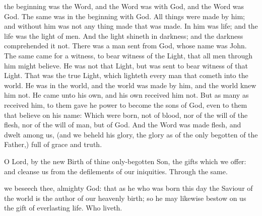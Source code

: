  the beginning was the Word, and the Word was with God, and the Word was God. The same was in the beginning with God. All things were made by him; and without him was not any thing made that was made. In him was life; and the life was the light of men. And the light shineth in darkness; and the darkness comprehended it not. There was a man sent from God, whose name was John. The same came for a witness, to bear witness of the Light, that all men through him might believe. He was not that Light, but was sent to bear witness of that Light. That was the true Light, which lighteth every man that cometh into the world. He was in the world, and the world was made by him, and the world knew him not. He came unto his own, and his own received him not. But as many as received him, to them gave he power to become the sons of God, even to them that believe on his name: Which were born, not of blood, nor of the will of the flesh, nor of the will of man, but of God.  And the Word was made flesh, and dwelt among us, (and we beheld his glory, the glory as of the only begotten of the Father,) full of grace and truth.


\secret\label{NativityMassIIISecret}
 O Lord, by the new Birth of thine only-begotten Son, the gifts which we offer: and cleanse us from the defilements of our iniquities. Through the same.


\postcommunion\label{NativityMassIIIPostcommunion}
 we beseech thee, almighty God: that as he who was born this day the Saviour of the world is the author of our heavenly birth; so he may likewise bestow on us the gift of everlasting life. Who liveth.

